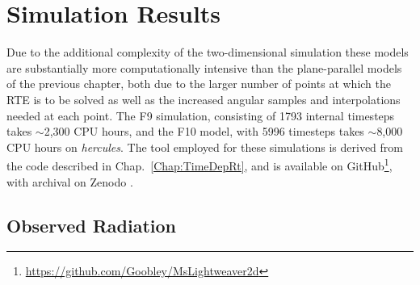 \section{Simulation Results}\label{Sec:2dSimResults}

Due to the additional complexity of the two-dimensional simulation these models are substantially more computationally intensive than the plane-parallel models of the previous chapter, both due to the larger number of points at which the RTE is to be solved as well as the increased angular samples and interpolations needed at each point.
The F9 simulation, consisting of 1793 internal timesteps takes $\sim$2,300 CPU hours, and the F10 model, with 5996 timesteps takes $\sim$8,000 CPU hours on \emph{hercules}.
The tool employed for these simulations is derived from the code described in Chap.~\ref{Chap:TimeDepRt}, and is available on GitHub\footnote{\url{https://github.com/Goobley/MsLightweaver2d}}, with archival on Zenodo \citep{MsLw2dThesisRelease}.

\subsection{Observed Radiation}





